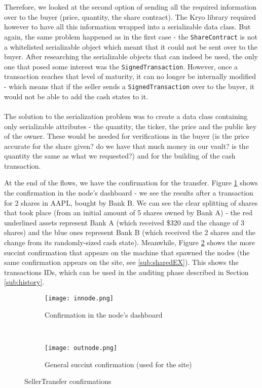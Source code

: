 \documentclass[12pt,twoside]{article}
\begin{document}
\\ \\
Therefore, we looked at the second option of sending all the required information over to the buyer (price, quantity, the share contract). The Kryo library required however to have all this information wrapped into a serializable data class. But again, the same problem happened as in the first case - the \verb|ShareContract| is not a whitelisted serializable object which meant that it could not be sent over to the buyer. After researching the serializable objects that can indeed be used, the only one that posed some interest was the \verb|SignedTransaction|. However, once a transaction reaches that level of maturity, it can no longer be internally modified - which means that if the seller sends a \verb|SignedTransaction| over to the buyer, it would not be able to add the cash states to it. 
\\ \\
The solution to the serialization problem was to create a data class containing only serializable attributes - the quantity, the ticker, the price and the public key of the owner. These would be needed for verifications in the buyer (is the price accurate for the share given? do we have that much money in our vault? is the quantity the same as what we requested?) and for the building of the cash transaction. 

At the end of the flows, we have the confirmation for the transfer. Figure \ref{fig:innodeconf} shows the confirmation in the node's dashboard - we see the results after a transaction for 2 shares in AAPL, bought by Bank B. We can see the clear splitting of shares that took place (from an initial amount of 5 shares owned by Bank A) - the red underlined assets represent Bank A (which received \$320 and the change of 3 shares) and the blue ones represent Bank B (which received the 2 shares and the change from its randomly-sized cash state). Meanwhile, Figure \ref{fig:outnodeconf} shows the more succint confirmation that appears on the machine that spawned the nodes (the same confirmation appears on the site, see \ref{sub:sharedEX}). This shows the transactions IDs, which can be used in the auditing phase described in Section \ref{sub:history}.
\begin{figure}[!htb]
    \centering
    \begin{subfigure}[b]{1\textwidth}
    	\centering
        \texttt{[image: innode.png]}
        \caption{Confirmation in the node's dashboard}
        \label{fig:innodeconf}
    \end{subfigure}
    ~
    \begin{subfigure}[b]{0.8\textwidth}
    	\centering
        \texttt{[image: outnode.png]}
        \caption{General succint confirmation (used for the site)}
        \label{fig:outnodeconf}
    \end{subfigure}
    \caption{SellerTransfer confirmations}
    \label{fig:confs}
\end{figure}
\end{document}
